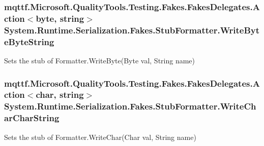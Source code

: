 \hypertarget{class_system_1_1_runtime_1_1_serialization_1_1_fakes_1_1_stub_formatter_a83132922f90234edf923d43175312ccc}{
\subsubsection[{Write\-Byte\-Byte\-String}]{\setlength{\rightskip}{0pt plus 5cm}mqttf.\-Microsoft.\-Quality\-Tools.\-Testing.\-Fakes.\-Fakes\-Delegates.\-Action$<$byte, string$>$ System.\-Runtime.\-Serialization.\-Fakes.\-Stub\-Formatter.\-Write\-Byte\-Byte\-String}}\label{class_system_1_1_runtime_1_1_serialization_1_1_fakes_1_1_stub_formatter_a83132922f90234edf923d43175312ccc}


Sets the stub of Formatter.\-Write\-Byte(\-Byte val, String name)

\hypertarget{class_system_1_1_runtime_1_1_serialization_1_1_fakes_1_1_stub_formatter_accd64b66ad924cadec51fa9cb8a23504}{
\subsubsection[{Write\-Char\-Char\-String}]{\setlength{\rightskip}{0pt plus 5cm}mqttf.\-Microsoft.\-Quality\-Tools.\-Testing.\-Fakes.\-Fakes\-Delegates.\-Action$<$char, string$>$ System.\-Runtime.\-Serialization.\-Fakes.\-Stub\-Formatter.\-Write\-Char\-Char\-String}}\label{class_system_1_1_runtime_1_1_serialization_1_1_fakes_1_1_stub_formatter_accd64b66ad924cadec51fa9cb8a23504}


Sets the stub of Formatter.\-Write\-Char(\-Char val, String name)

